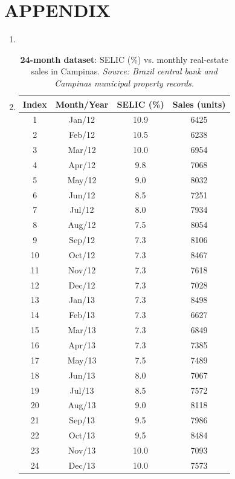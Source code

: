 \documentclass{article}
\begin{document}
\clearpage
\section{APPENDIX}
\label{Appendix}

\begin{enumerate}\item 

\item 
\begin{table}[H]
\centering
\begin{tabular}{cccc}
\toprule
\textbf{Index} & \textbf{Month/Year} & \textbf{SELIC (\%)} & \textbf{Sales (units)} \\
\midrule
1  & Jan/12 & 10.9 & 6425\\
2  & Feb/12 & 10.5 & 6238\\
3  & Mar/12 & 10.0 & 6954\\
4  & Apr/12 & 9.8  & 7068\\
5  & May/12 & 9.0  & 8032\\
6  & Jun/12 & 8.5  & 7251\\
7  & Jul/12 & 8.0  & 7934\\
8  & Aug/12 & 7.5  & 8054\\
9  & Sep/12 & 7.3  & 8106\\
10 & Oct/12 & 7.3  & 8467\\
11 & Nov/12 & 7.3  & 7618\\
12 & Dec/12 & 7.3  & 7028\\
13 & Jan/13 & 7.3  & 8498\\
14 & Feb/13 & 7.3  & 6627\\
15 & Mar/13 & 7.3  & 6849\\
16 & Apr/13 & 7.3  & 7385\\
17 & May/13 & 7.5  & 7489\\
18 & Jun/13 & 8.0  & 7067\\
19 & Jul/13 & 8.5  & 7572\\
20 & Aug/13 & 9.0  & 8118\\
21 & Sep/13 & 9.5  & 7986\\
22 & Oct/13 & 9.5  & 8484\\
23 & Nov/13 & 10.0 & 7093\\
24 & Dec/13 & 10.0 & 7573\\
\bottomrule
\end{tabular}
\caption{\textbf{24-month dataset}: SELIC (\%) vs. monthly real-estate sales in Campinas. \emph{Source: Brazil central bank and Campinas municipal property records.}}
\label{tab:dataset24}
\end{table}


\end{enumerate}
\end{document}

